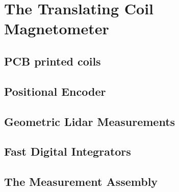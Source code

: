 \chapter{The Translating Coil Magnetometer}
\section{PCB printed coils}
\section{Positional Encoder}
\section{Geometric Lidar Measurements}
\section{Fast Digital Integrators}
\section{The Measurement Assembly}